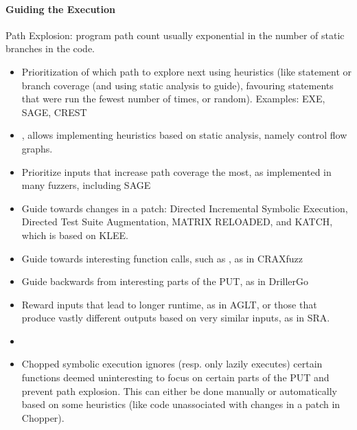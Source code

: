 \documentclass{article}
\begin{document}
\paragraph{Guiding the Execution}
Path Explosion: program path count usually exponential in the number of static branches in the code.
\begin{itemize}
  \item Prioritization of which path to explore next using heuristics (like statement or branch coverage (and using static analysis to guide), favouring statements that were run the fewest number of times, or random). Examples: EXE\cite{EXE}, SAGE\cite{SAGE}, CREST\cite{CREST}
  \item {}\cite{ReviewThreeDecades}, allows implementing heuristics based on static analysis, namely control flow graphs.
  \item Prioritize inputs that increase path coverage the most, as implemented in many fuzzers, including SAGE\cite{SAGE}
  \item Guide towards changes in a patch: Directed Incremental Symbolic Execution\cite{DiSE}, Directed Test Suite Augmentation\cite{DTSA}, MATRIX RELOADED\cite{MATRIXRELOADED}, and KATCH\cite{KATCH}, which is based on KLEE\cite{KLEE}.
  \item Guide towards interesting function calls, such as , as in CRAXfuzz\cite{CRAXfuzz}
  \item Guide backwards from interesting parts of the PUT, as in DrillerGo\cite{DrillerGo}
  \item Reward inputs that lead to longer runtime, as in AGLT\cite{AGLT}, or those that produce vastly different outputs based on very similar inputs, as in SRA\cite{SRA}.
  \item {}\cite{Fitnex}
  \item Chopped symbolic execution ignores (resp. only lazily executes) certain functions deemed uninteresting to focus on certain parts of the PUT and prevent path explosion. This can either be done manually or automatically based on some heuristics (like code unassociated with changes in a patch in Chopper\cite{Chopped}).

\end{itemize}
\end{document}
